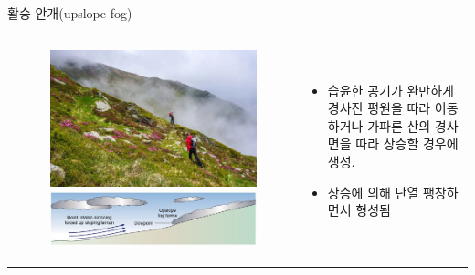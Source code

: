 \begin{frame}[t]{활승 안개(upslope fog)}
	\begin{tabular}{ll}
		\begin{minipage}[t]{0.5\textwidth}\scriptsize
			\begin{figure}[t]
				\includegraphics[width=\textwidth]{./images/upslope}
				\includegraphics[width=\textwidth]{./images/upslope1} 
			\end{figure}
		\end{minipage}	
		&
		\begin{minipage}[t]{0.45\textwidth} \scriptsize
			\begin{itemize}
				\item 습윤한 공기가 완만하게 경사진 평원을 따라 이동하거나 가파른 산의 경사면을 따라 상승할 경우에 생성. 
				\item 상승에 의해 단열 팽창하면서 형성됨
			\end{itemize}		
		\end{minipage}
	\end{tabular}
\end{frame}




